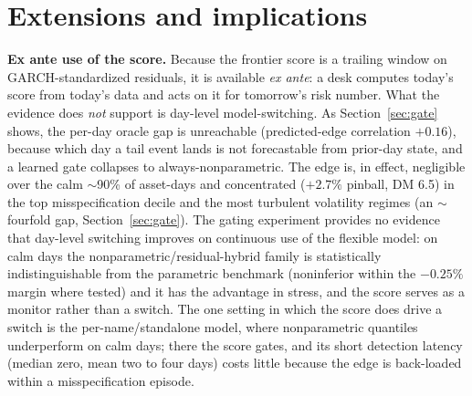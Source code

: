 \documentclass[11pt]{article}
\theoremstyle{remark}
\begin{document}
\section{Extensions and implications}\label{sec:applications}

\medskip\noindent{}

\medskip
\textbf{Ex ante use of the score.} Because the frontier score is a trailing window on
GARCH-standardized residuals, it is available \emph{ex ante}: a desk
computes today's score from today's data and acts on it for tomorrow's
risk number. What the evidence does \emph{not} support is day-level
model-switching. As Section~\ref{sec:gate} shows, the per-day oracle gap
is unreachable (predicted-edge correlation $+0.16$), because which day a
tail event lands is not forecastable from prior-day state, and a learned
gate collapses to always-nonparametric. The edge is, in effect,
negligible over the calm $\sim$90\% of asset-days and concentrated
($+2.7\%$ pinball, DM 6.5) in the top misspecification decile and the
most turbulent volatility regimes (an $\sim$fourfold gap,
Section~\ref{sec:gate}). The gating experiment provides no evidence
that day-level switching improves on continuous use of the flexible
model: on calm days the nonparametric/residual-hybrid family is
statistically indistinguishable from the parametric benchmark
(noninferior within the $-0.25\%$ margin where tested) and it has the
advantage in stress, and the score serves as a monitor rather than a
switch. The
one setting in which the score does drive a switch is the
per-name/standalone model, where nonparametric quantiles underperform on
calm days; there the score gates, and its short detection latency
(median zero, mean two to four days) costs little because the edge is
back-loaded within a misspecification episode.
\end{document}
